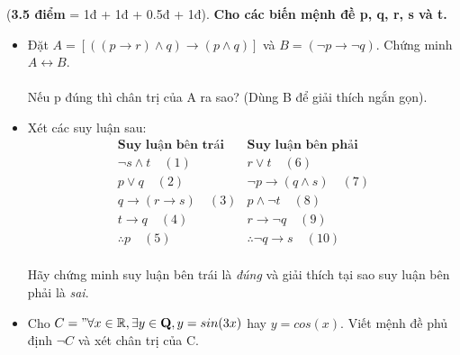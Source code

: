 \documentclass[a4paper]{exam}
\begin{document}
	\begin{center}
	\end{center}
	
	\vspace*{2mm}
	
	\begin{questions}
		\question (\textbf{3.5 điểm} = 1đ + 1đ + 0.5đ + 1đ). \textbf{Cho các biến mệnh đề p, q, r, s và t.}
			\begin{itemize}
				\item Đặt $A = \left[((p \longrightarrow r) \land q) \longrightarrow (p \land q) \right]$ và $B = (\neg p \longrightarrow \neg q)$. Chứng minh $A \longleftrightarrow B$.\\
					\\Nếu p đúng thì chân trị của A ra sao? (Dùng B để giải thích ngắn gọn).\\
				\item Xét các suy luận sau:\\
					\[
					\begin{array}{c|c}
						\textbf{Suy luận bên trái} & \textbf{Suy luận bên phải}\\
						\hline
						\neg s \land t \quad (1) & r \lor t \quad (6)\\[1mm]
						p \lor q \quad (2) & \neg p \longrightarrow (q \land s) \quad (7)\\[1mm]
						q \longrightarrow (r \longrightarrow s) \quad (3) & p \land \neg t \quad (8)\\[1mm]
						t \longrightarrow q \quad (4) & r \longrightarrow \neg q \quad (9)\\[1mm]
						\hline
						\therefore p \quad (5) & \therefore \neg q \longrightarrow s \quad (10)
					\end{array}
					\]\\
					Hãy chứng minh suy luận bên trái là \textit{đúng} và giải thích tại sao suy luận bên phải là \textit{sai}.\\
				\item Cho $C = "\forall x \in \mathbb{R}, \exists y \in \mathbf{Q}, y = sin(3x)$ hay $y = cos(x)$. Viết mệnh đề phủ định $\neg C$ và xét chân trị của C.\\

\end{itemize}
\end{questions}
\end{document}
